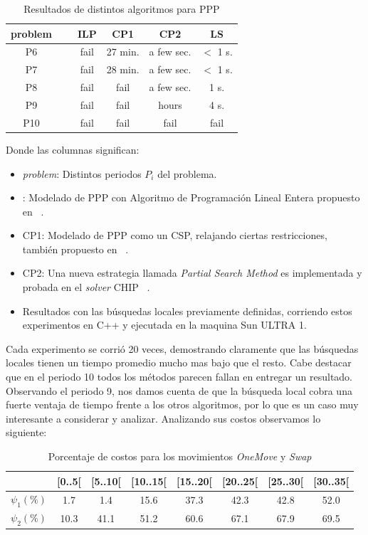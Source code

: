 \documentclass[letter, 10pt]{article}
\begin{document}
\begin{table}[ht!]
\centering
    \begin{tabular}{|c|l|c|c|c|c|}
    \hline
    problem & ~ & ILP  & CP1     & CP2        & LS     \\ \hline
    P6      & ~ & fail & 27 min. & a few sec. & $<$ 1 s. \\
    P7      & ~ & fail & 28 min. & a few sec. & $<$ 1 s. \\
    P8      & ~ & fail & fail    & a few sec. & 1 s.   \\
    P9      & ~ & fail & fail    & hours      & 4 s.   \\
    P10     & ~ & fail & fail    & fail       & fail   \\ \hline
    \end{tabular}
    \caption{Resultados de distintos algoritmos para PPP}
\label{table:kysymys}
\end{table}

Donde las columnas significan:
\begin{itemize}
    \item \textit{problem}: Distintos periodos $P_i$ del problema.
    \item {}: Modelado de PPP con Algoritmo de Programación Lineal Entera propuesto en ~\cite{Smith1996}.
    \item{CP1}: Modelado de PPP como un CSP, relajando ciertas restricciones, también propuesto en ~\cite{Smith1996}.
    \item{CP2}: Una nueva estrategia llamada \textit{Partial Search Method} es implementada y probada en el \textit{solver} CHIP ~\cite{CHIP1997}. 
    \item Resultados con las búsquedas locales previamente definidas, corriendo estos experimentos en C++ y ejecutada en la maquina Sun ULTRA 1.
\end{itemize}

Cada experimento se corrió 20 veces, demostrando claramente que las búsquedas locales tienen un tiempo promedio mucho mas bajo que el resto. Cabe destacar que en el periodo 10 todos los métodos parecen fallan en entregar un resultado. Observando el periodo 9, nos damos cuenta de que la búsqueda local cobra una fuerte ventaja de tiempo frente a los otros algoritmos, por lo que es un caso muy interesante a considerar y analizar. Analizando sus costos observamos lo siguiente:

\begin{table}[!ht]
\centering
    \begin{tabular}{|c|c|c|c|c|c|c|c|}
    \hline
    ~     & [0..5[ & [5..10[ & [10..15[ & [15..20[ & [20..25[ & [25..30[ & [30..35[ \\ \hline
    $\psi_1(\%)$  & 1.7    & 1.4     & 15.6     & 37.3     & 42.3     & 42.8     & 52.0    \\
    $\psi_2(\%)$ & 10.3   & 41.1    & 51.2     & 60.6     & 67.1     & 67.9     & 69.5    \\ \hline
    \end{tabular}
    \caption{Porcentaje de costos para los movimientos \textit{OneMove} y \textit{Swap}}
\label{table:porcentajes}
\end{table}
\end{document}
